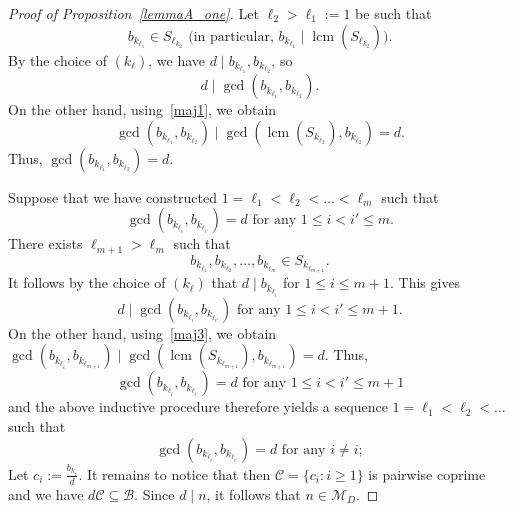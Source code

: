 \documentclass[leqno,a4paper,12pt]{article}
\DeclareMathOperator{\lcm}{lcm}
\theoremstyle{definition}
\newcommand{\divides}{\mid}
\begin{document}
\begin{proof}[Proof of Proposition~\ref{lemmaA_one}]
Let $\ell_2>\ell_1:=1$ be such that
\begin{equation}\label{maj1}
b_{k_{\ell_1}}\in S_{\ell_{k_2}} \text{ (in particular, $b_{k_{\ell_1}}\divides \lcm(S_{\ell_{k_2}})$)}.
\end{equation}
By the choice of $(k_\ell)$, we have $d\divides b_{k_{\ell_1}},b_{k_{\ell_2}}$, so
\[
d\divides \gcd(b_{k_{\ell_1}},b_{k_{\ell_2}}).
\]
On the other hand, using~\eqref{maj1}, we obtain
\[
\gcd(b_{k_{\ell_1}},b_{k_{\ell_2}})\divides \gcd(\lcm(S_{k_{\ell_2}}),b_{k_{\ell_2}})=d.
\]
Thus, $\gcd(b_{k_{\ell_1}},b_{k_{\ell_2}})=d$.

Suppose that we have constructed $1=\ell_1<\ell_2<\dots<\ell_m$ such that
\begin{equation}\label{maj2}
\gcd(b_{k_{\ell_i}},b_{k_{\ell_{i'}}})=d \text{ for any }1\leq i<i'\leq m.
\end{equation}
There exists $\ell_{m+1}>\ell_m$ such that
\begin{equation}\label{maj3}
b_{k_{\ell_1}},b_{k_{\ell_2}},\dots,b_{k_{\ell_m}}\in S_{k_{\ell_{m+1}}}.
\end{equation}
It follows by the choice of $(k_\ell)$ that $d\divides b_{k_{\ell_i}}$ for $1\leq i\leq m+1$. This gives
\[
d\divides \gcd(b_{k_{\ell_i}},b_{k_{\ell_{i'}}}) \text{ for any }1\leq i<i'\leq m+1.
\]
On the other hand, using~\eqref{maj3}, we obtain $\gcd(b_{k_{\ell_i}},b_{k_{\ell_{m+1}}})\divides\gcd(\lcm(S_{k_{\ell_{m+1}}}),b_{k_{\ell_{m+1}}})=d$. Thus,
\[
\gcd(b_{k_{\ell_i}},b_{k_{\ell_{i'}}})=d \text{ for any }1\leq i<i'\leq m+1
\]
and the above inductive procedure therefore yields a sequence $1=\ell_1<\ell_2<\dots$ such that
\[
\gcd(b_{k_{\ell_i}},b_{k_{\ell_{i'}}})=d \text{ for any }i\neq i;
\]
Let $c_i:=\frac{b_{k_i}}{d}$. It remains to notice that then $\mathcal{C}=\{c_i : i\geq 1\}$ is pairwise coprime and we have $d\mathcal{C}\subseteq \mathscr{B}$. Since $d\divides n$, it follows that $n\in\mathcal{M}_D$.


\end{proof}
\end{document}
